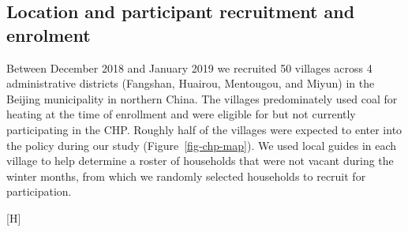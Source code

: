 \documentclass[
  letterpaper,
  DIV=11,
  numbers=noendperiod]{scrartcl}
\makeatletter
\renewenvironment{figure}%
   {\renewcommand\familydefault\sfdefault
    \@float{figure}}
   {\end@float}
\makeatother
\begin{document}
\subsection{Location and participant recruitment and
enrolment}\label{location-and-participant-recruitment-and-enrolment}

Between December 2018 and January 2019 we recruited 50 villages across 4
administrative districts (Fangshan, Huairou, Mentougou, and Miyun) in
the Beijing municipality in northern China. The villages predominately
used coal for heating at the time of enrollment and were eligible for
but not currently participating in the CHP. Roughly half of the villages
were expected to enter into the policy during our study 
(Figure~\ref{fig-chp-map}). We used local guides in each village to help
determine a roster of households that were not vacant during the winter
months, from which we randomly selected households to recruit for
participation.

\begin{figure}[H]


\caption{\label{fig-chp-map}Map of village implementation of CBHP
policy. Each circle represents one recruited village. The colors of the
circles indicate the year the villages were exposed to the household
energy transition policy.}

\end{figure}%
\end{document}
